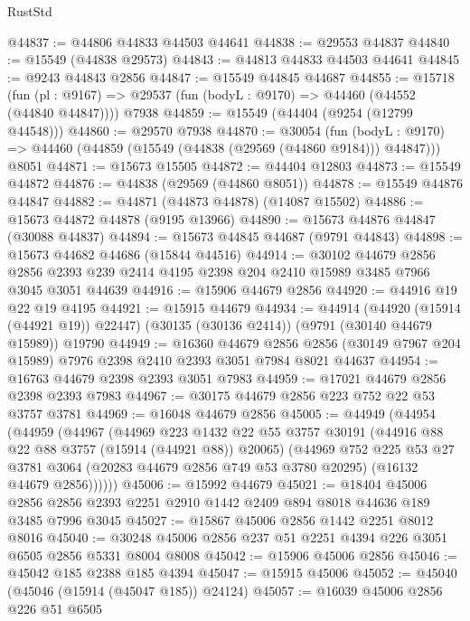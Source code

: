 \begin{lexlean}{RustStd}
\begin{coremodule}
@44837 := @44806 @44833 @44503 @44641
@44838 := @29553 @44837
@44840 := @15549 (@44838 @29573)
@44843 := @44813 @44833 @44503 @44641
@44845 := @9243 @44843 @2856
@44847 := @15549 @44845 @44687
@44855 := @15718
    (fun (pl : @9167) => @29537 (fun (bodyL : @9170) => @44460 (@44552 (@44840 @44847))))
    @7938
@44859 := @15549 (@44404 (@9254 (@12799 @44548)))
@44860 := @29570 @7938
@44870 := @30054
    (fun (bodyL : @9170) => @44460 (@44859 (@15549 (@44838 (@29569 (@44860 @9184))) @44847)))
    @8051
@44871 := @15673 @15505
@44872 := @44404 @12803
@44873 := @15549 @44872
@44876 := @44838 (@29569 (@44860 @8051))
@44878 := @15549 @44876 @44847
@44882 := @44871 (@44873 @44878) (@14087 @15502)
@44886 := @15673 @44872 @44878 (@9195 @13966)
@44890 := @15673 @44876 @44847 (@30088 @44837)
@44894 := @15673 @44845 @44687 (@9791 @44843)
@44898 := @15673 @44682 @44686 (@15844 @44516)
@44914 := @30102
    @44679
    @2856
    @2856
    @2393
    @239
    @2414
    @4195
    @2398
    @204
    @2410
    @15989
    @3485
    @7966
    @3045
    @3051
    @44639
@44916 := @15906 @44679 @2856
@44920 := @44916 @19 @22 @19 @4195
@44921 := @15915 @44679
@44934 := @44914
    (@44920 (@15914 (@44921 @19)) @22447)
    (@30135 (@30136 @2414))
    (@9791 (@30140 @44679 @15989))
    @19790
@44949 := @16360
    @44679
    @2856
    @2856
    (@30149 @7967 @204 @15989)
    @7976
    @2398
    @2410
    @2393
    @3051
    @7984
    @8021
    @44637
@44954 := @16763 @44679 @2398 @2393 @3051 @7983
@44959 := @17021 @44679 @2856 @2398 @2393 @7983
@44967 := @30175 @44679 @2856 @223 @752 @22 @53 @3757 @3781
@44969 := @16048 @44679 @2856
@45005 := @44949
    (@44954
      (@44959
        (@44967
          (@44969
            @223
            @1432
            @22
            @55
            @3757
            @30191
            (@44916 @88 @22 @88 @3757 (@15914 (@44921 @88)) @20065)
            (@44969
              @752
              @225
              @53
              @27
              @3781
              @3064
              (@20283 @44679 @2856 @749 @53 @3780 @20295)
              (@16132 @44679 @2856))))))
@45006 := @15992 @44679
@45021 := @18404
    @45006
    @2856
    @2856
    @2393
    @2251
    @2910
    @1442
    @2409
    @894
    @8018
    @44636
    @189
    @3485
    @7996
    @3045
@45027 := @15867 @45006 @2856 @1442 @2251 @8012 @8016
@45040 := @30248 @45006 @2856 @237 @51 @2251 @4394 @226 @3051 @6505 @2856 @5331 @8004 @8008
@45042 := @15906 @45006 @2856
@45046 := @45042 @185 @2388 @185 @4394
@45047 := @15915 @45006
@45052 := @45040 (@45046 (@15914 (@45047 @185)) @24124)
@45057 := @16039 @45006 @2856 @226 @51 @6505

\end{coremodule}
\end{lexlean}
